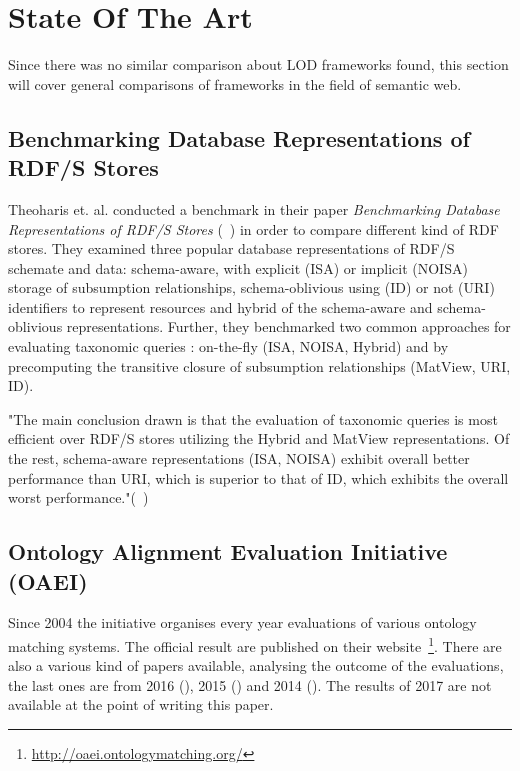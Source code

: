 \chapter{State Of The Art}

Since there was no similar comparison about LOD frameworks found, this section will cover general comparisons of frameworks in the field of semantic web.

\section{Benchmarking Database Representations of RDF/S Stores}

Theoharis et. al. conducted a benchmark in their paper \emph{Benchmarking Database Representations of RDF/S Stores} (~\cite{theoharis2005benchmarking}) in order to compare different kind of RDF stores. They examined three popular database representations of RDF/S schemate and data: schema-aware, with explicit (ISA) or implicit (NOISA) storage of subsumption relationships, schema-oblivious using (ID) or not (URI) identifiers to represent resources and hybrid of the schema-aware and schema-oblivious representations. Further, they benchmarked two common approaches for evaluating taxonomic queries : on-the-fly (ISA, NOISA, Hybrid) and by precomputing the transitive closure of subsumption relationships (MatView, URI, ID). 

"The main conclusion drawn is that the evaluation of taxonomic queries is most efficient over RDF/S stores utilizing the Hybrid and MatView representations. Of the rest, schema-aware representations (ISA, NOISA) exhibit overall better performance than URI, which is superior to that of ID, which exhibits the overall worst performance."(~\cite{theoharis2005benchmarking})

\section{Ontology Alignment Evaluation Initiative (OAEI)}

Since 2004 the initiative organises every year evaluations of various ontology matching systems. The official result are published on their website~\footnote{\url{http://oaei.ontologymatching.org/}}. There are also a various kind of papers available, analysing the outcome of the evaluations, the last ones are from 2016 (\cite{achichi2016results}), 2015 (\cite{cheatham2015results}) and 2014 (\cite{dragisic2014results}). The results of 2017 are not available at the point of writing this paper.

